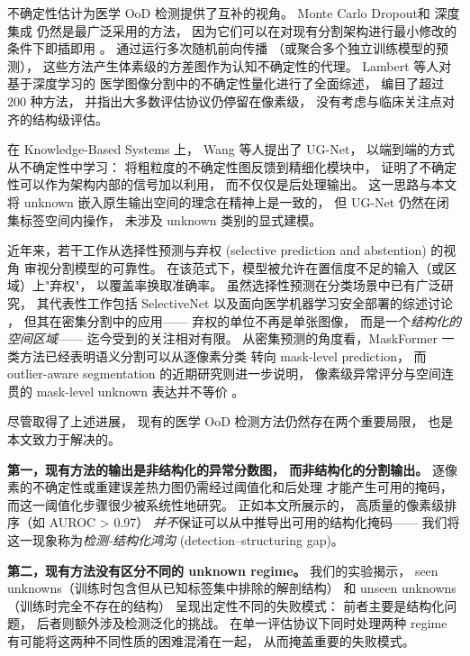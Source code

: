 \documentclass[3p,twocolumn,authoryear]{elsarticle}
\begin{document}
不确定性估计为医学 OoD 检测提供了互补的视角。
Monte Carlo Dropout和
深度集成
仍然是最广泛采用的方法，
因为它们可以在对现有分割架构进行最小修改的条件下即插即用
\cite{lambert2022trustworthyclinical,musah2025towardstrustworthy}。
通过运行多次随机前向传播
（或聚合多个独立训练模型的预测），
这些方法产生体素级的方差图作为认知不确定性的代理。
Lambert 等人对基于深度学习的
医学图像分割中的不确定性量化进行了全面综述，
编目了超过 200 种方法，
并指出大多数评估协议仍停留在像素级，
没有考虑与临床关注点对齐的结构级评估\cite{lambert2022trustworthyclinical}。

在 Knowledge-Based Systems 上，
Wang 等人提出了 UG-Net，
以端到端的方式从不确定性中学习：
将粗粒度的不确定性图反馈到精细化模块中，
证明了不确定性可以作为架构内部的信号加以利用，
而不仅仅是后处理输出\cite{wang2022uncertaintyguided}。
这一思路与本文将 unknown 嵌入原生输出空间的理念在精神上是一致的，
但 UG-Net 仍然在闭集标签空间内操作，
未涉及 unknown 类别的显式建模。

 
近年来，若干工作从选择性预测与弃权
(selective prediction and abstention) 的视角
审视分割模型的可靠性。
在该范式下，模型被允许在置信度不足的输入（或区域）上"弃权"，
以覆盖率换取准确率。
虽然选择性预测在分类场景中已有广泛研究，
其代表性工作包括 SelectiveNet 以及面向医学机器学习安全部署的综述讨论
\cite{geifman2019selectivenetdeep,kompa2021secondopinion}，
但其在密集分割中的应用——
弃权的单位不再是单张图像，
而是一个\emph{结构化的空间区域}——
迄今受到的关注相对有限。
从密集预测的角度看，MaskFormer 一类方法已经表明语义分割可以从逐像素分类
转向 mask-level prediction，
而 outlier-aware segmentation 的近期研究则进一步说明，
像素级异常评分与空间连贯的 mask-level unknown 表达并不等价
\cite{cheng2021perpixel,grcic2023advantagesmask}。
 
尽管取得了上述进展，
现有的医学 OoD 检测方法仍然存在两个重要局限，
也是本文致力于解决的。
 
\textbf{第一，现有方法的输出是非结构化的异常分数图，
而非结构化的分割输出。}
逐像素的不确定性或重建误差热力图仍需经过阈值化和后处理
才能产生可用的掩码，
而这一阈值化步骤很少被系统性地研究。
正如本文所展示的，
高质量的像素级排序（如 AUROC > 0.97）
\emph{并不}保证可以从中推导出可用的结构化掩码——
我们将这一现象称为\emph{检测-结构化鸿沟} (detection--structuring gap)。
 
\textbf{第二，现有方法没有区分不同的 unknown regime。}
我们的实验揭示，
seen unknowns（训练时包含但从已知标签集中排除的解剖结构）
和 unseen unknowns（训练时完全不存在的结构）
呈现出定性不同的失败模式：
前者主要是结构化问题，
后者则额外涉及检测泛化的挑战。
在单一评估协议下同时处理两种 regime
有可能将这两种不同性质的困难混淆在一起，
从而掩盖重要的失败模式。
 
\end{document}

